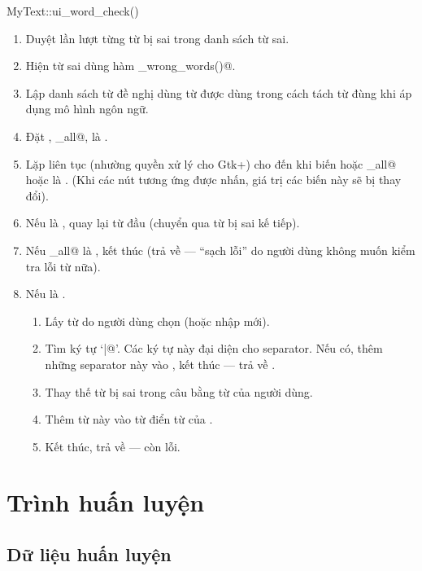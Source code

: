 \documentclass[a4paper,oneside,14pt]{extbook} %
\begin{document}
\begin{algo}
\caption{MyText::ui\_word\_check()}
\label{algo:MyText::ui_word_check}
\begin{enumerate}
\item Duyệt lần lượt từng từ bị sai trong danh sách từ sai.
\item Hiện từ sai dùng hàm \verb@show_wrong_words()@.
\item Lập danh sách từ đề nghị dùng từ được dùng trong cách tách từ
  đùng khi áp dụng mô hình ngôn ngữ.
\item Đặt \verb@processed@, \verb@ignore_all@, \verb@ignore@ là
  \verb@false@. 
\item Lặp liên tục (nhường quyền xử lý cho Gtk+) cho đến khi biến
  \verb@ignore@ hoặc \verb@ignore_all@ hoặc \verb@processed@ là
  \verb@true@. (Khi các nút tương ứng được nhấn, giá trị các biến này
  sẽ bị thay đổi).
\item Nếu \verb@ignore@ là \verb@true@, quay lại từ đầu (chuyển qua từ bị sai
  kế tiếp).
\item Nếu \verb@ignore_all@ là \verb@true@, kết thúc (trả về
  \verb@true@ --- ``sạch lỗi'' do người dùng không muốn kiểm tra lỗi
  từ nữa).
\item Nếu \verb@processed@ là \verb@true@.
  \begin{enumerate}
  \item Lấy từ do người dùng chọn (hoặc nhập mới).
  \item Tìm ký tự `\verb@|@'. Các ký tự này đại diện cho
    separator. Nếu có, thêm những separator này vào \verb@VSpell@, kết thúc
    --- trả về \verb@false@.
  \item Thay thế từ bị sai trong câu bằng từ của người dùng.
  \item Thêm từ này vào từ điển từ của \verb@VSpell@.
  \item Kết thúc, trả về \verb@false@ --- còn lỗi.
  \end{enumerate}
\end{enumerate}
\end{algo}

\section{Trình huấn luyện}

\subsection{Dữ liệu huấn luyện}
\label{sec:data-preprocessing}
\end{document}
